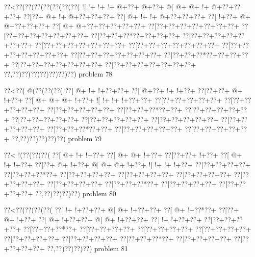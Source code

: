 \vbox{\vbox{\goo
\0??<\0??(\0??(\0??(\0??(\0??(\0??(\0??(
\- ![\- !+\- !+\- !+\- @+\0??+\- @+\0??+
\- @[\- @+\- @+\- !+\- @+\0??+\0??+\0??+
\0??[\0??+\- @+\- !+\- @+\0??+\0??+\0??+
\0??[\- @+\- !+\- !+\- @+\0??+\0??+\0??+
\0??[\- !+\0??+\- @+\- @+\0??+\0??+\0??+
\0??[\- @+\- @+\0??+\0??+\0??+\0??+\0??+
\0??[\0??+\0??+\0??+\0??+\0??+\0??+\0??+
\0??[\0??+\0??+\0??+\0??+\0??+\0??+\0??+
\0??[\0??+\0??+\0??*\0??+\0??+\0??+\0??+
\0??[\0??+\0??+\0??+\0??+\0??+\0??+\0??+
\0??[\0??+\0??+\0??+\0??+\0??+\0??+\0??+
\0??[\0??+\0??+\0??+\0??+\0??+\0??+\0??+
\0??[\0??+\0??+\0??+\0??+\0??+\0??+\0??+
\0??[\0??+\0??+\0??+\0??+\0??+\0??+\0??+
\0??[\0??+\0??+\0??*\0??+\0??+\0??+\0??+
\0??[\0??+\0??+\0??+\0??+\0??+\0??+\0??+
\0??[\0??+\0??+\0??+\0??+\0??+\0??+\0??+
\0??,\0??)\0??)\0??)\0??)\0??)\0??)\0??)
}
\hfil problem 78\hfil\break
}

\vbox{\vbox{\goo
\0??<\0??(\- @(\0??(\0??(\0??(
\0??[\- @+\- !+\- !+\0??+\0??+
\0??[\- @+\0??+\- !+\- !+\0??+
\0??[\0??+\0??+\- @+\- !+\0??+
\0??[\- @+\- @+\- @+\- !+\0??+
\- ![\- !+\- !+\- !+\0??+\0??+
\0??[\0??+\0??+\0??+\0??+\0??+
\0??[\0??+\0??+\0??+\0??+\0??+
\0??[\0??+\0??+\0??+\0??+\0??+
\0??[\0??+\0??+\0??*\0??+\0??+
\0??[\0??+\0??+\0??+\0??+\0??+
\0??[\0??+\0??+\0??+\0??+\0??+
\0??[\0??+\0??+\0??+\0??+\0??+
\0??[\0??+\0??+\0??+\0??+\0??+
\0??[\0??+\0??+\0??+\0??+\0??+
\0??[\0??+\0??+\0??*\0??+\0??+
\0??[\0??+\0??+\0??+\0??+\0??+
\0??[\0??+\0??+\0??+\0??+\0??+
\0??,\0??)\0??)\0??)\0??)\0??)
}
\hfil problem 79\hfil\break
}

\vbox{\vbox{\goo
\0??<\- !(\0??(\0??(\0??(
\0??[\- @+\- !+\- !+\0??+
\0??[\- @+\- @+\- !+\0??+
\0??[\0??+\0??+\- !+\0??+
\0??[\- @+\- !+\- !+\0??+
\0??[\0??+\- @+\- !+\0??+
\- @[\- @+\- @+\- !+\0??+
\- ![\- !+\- !+\- !+\0??+
\0??[\0??+\0??+\0??+\0??+
\0??[\0??+\0??+\0??*\0??+
\0??[\0??+\0??+\0??+\0??+
\0??[\0??+\0??+\0??+\0??+
\0??[\0??+\0??+\0??+\0??+
\0??[\0??+\0??+\0??+\0??+
\0??[\0??+\0??+\0??+\0??+
\0??[\0??+\0??+\0??*\0??+
\0??[\0??+\0??+\0??+\0??+
\0??[\0??+\0??+\0??+\0??+
\0??,\0??)\0??)\0??)\0??)
}
\hfil problem 80\hfil\break
}

\vbox{\vbox{\goo
\0??<\0??(\0??(\0??(\0??(
\0??[\- !+\- !+\0??+\0??+
\- @[\- @+\- !+\0??+\0??+
\0??[\- @+\- !+\0??*\0??+
\0??[\0??+\- @+\- !+\0??+
\0??[\- @+\- !+\0??+\0??+
\- @[\- @+\- !+\0??+\0??+
\0??[\- !+\- !+\0??+\0??+
\0??[\0??+\0??+\0??+\0??+
\0??[\0??+\0??+\0??*\0??+
\0??[\0??+\0??+\0??+\0??+
\0??[\0??+\0??+\0??+\0??+
\0??[\0??+\0??+\0??+\0??+
\0??[\0??+\0??+\0??+\0??+
\0??[\0??+\0??+\0??+\0??+
\0??[\0??+\0??+\0??*\0??+
\0??[\0??+\0??+\0??+\0??+
\0??[\0??+\0??+\0??+\0??+
\0??,\0??)\0??)\0??)\0??)
}
\hfil problem 81\hfil\break
}

